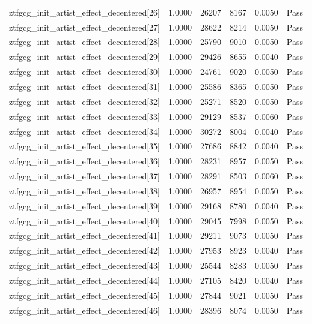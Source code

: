 \begin{table}[htbp]
\begin{tabular}{llrrll}
ztfgcg\_init\_artist\_effect\_decentered[26] & 1.0000 & 26207 & 8167 & 0.0050 & Pass \\
ztfgcg\_init\_artist\_effect\_decentered[27] & 1.0000 & 28622 & 8214 & 0.0050 & Pass \\
ztfgcg\_init\_artist\_effect\_decentered[28] & 1.0000 & 25790 & 9010 & 0.0050 & Pass \\
ztfgcg\_init\_artist\_effect\_decentered[29] & 1.0000 & 29426 & 8655 & 0.0040 & Pass \\
ztfgcg\_init\_artist\_effect\_decentered[30] & 1.0000 & 24761 & 9020 & 0.0050 & Pass \\
ztfgcg\_init\_artist\_effect\_decentered[31] & 1.0000 & 25586 & 8365 & 0.0050 & Pass \\
ztfgcg\_init\_artist\_effect\_decentered[32] & 1.0000 & 25271 & 8520 & 0.0050 & Pass \\
ztfgcg\_init\_artist\_effect\_decentered[33] & 1.0000 & 29129 & 8537 & 0.0060 & Pass \\
ztfgcg\_init\_artist\_effect\_decentered[34] & 1.0000 & 30272 & 8004 & 0.0040 & Pass \\
ztfgcg\_init\_artist\_effect\_decentered[35] & 1.0000 & 27686 & 8842 & 0.0040 & Pass \\
ztfgcg\_init\_artist\_effect\_decentered[36] & 1.0000 & 28231 & 8957 & 0.0050 & Pass \\
ztfgcg\_init\_artist\_effect\_decentered[37] & 1.0000 & 28291 & 8503 & 0.0060 & Pass \\
ztfgcg\_init\_artist\_effect\_decentered[38] & 1.0000 & 26957 & 8954 & 0.0050 & Pass \\
ztfgcg\_init\_artist\_effect\_decentered[39] & 1.0000 & 29168 & 8780 & 0.0040 & Pass \\
ztfgcg\_init\_artist\_effect\_decentered[40] & 1.0000 & 29045 & 7998 & 0.0050 & Pass \\
ztfgcg\_init\_artist\_effect\_decentered[41] & 1.0000 & 29211 & 9073 & 0.0050 & Pass \\
ztfgcg\_init\_artist\_effect\_decentered[42] & 1.0000 & 27953 & 8923 & 0.0040 & Pass \\
ztfgcg\_init\_artist\_effect\_decentered[43] & 1.0000 & 25544 & 8283 & 0.0050 & Pass \\
ztfgcg\_init\_artist\_effect\_decentered[44] & 1.0000 & 27105 & 8420 & 0.0040 & Pass \\
ztfgcg\_init\_artist\_effect\_decentered[45] & 1.0000 & 27844 & 9021 & 0.0050 & Pass \\
ztfgcg\_init\_artist\_effect\_decentered[46] & 1.0000 & 28396 & 8074 & 0.0050 & Pass \\

\end{tabular}
\end{table}
